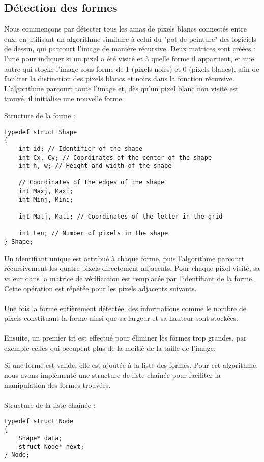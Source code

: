 \documentclass{article}
\begin{document}
\newpage
\subsection{Détection des formes}

Nous commençons par détecter tous les amas de pixels blancs connectés entre eux, en utilisant un algorithme similaire à celui du "pot de peinture" des logiciels de dessin, qui parcourt l'image de manière récursive.
Deux matrices sont créées : l'une pour indiquer si un pixel a été visité et à quelle forme il appartient, et une autre qui stocke l'image sous forme de 1 (pixels noirs) et 0 (pixels blancs), afin de faciliter la distinction des pixels blancs et noirs dans la fonction récursive.
L'algorithme parcourt toute l'image et, dès qu'un pixel blanc non visité est trouvé, il initialise une nouvelle forme.

\noindent Structure de la forme :
\begin{lstlisting}
typedef struct Shape 
{
    int id; // Identifier of the shape
    int Cx, Cy; // Coordinates of the center of the shape
    int h, w; // Height and width of the shape

    // Coordinates of the edges of the shape
    int Maxj, Maxi;
    int Minj, Mini;

    int Matj, Mati; // Coordinates of the letter in the grid

    int Len; // Number of pixels in the shape
} Shape;

\end{lstlisting}

\vspace{0.5cm}
\newpage
Un identifiant unique est attribué à chaque forme, puis l'algorithme parcourt récursivement les quatre pixels directement adjacents. Pour chaque pixel visité, sa valeur dans la matrice de vérification est remplacée par l’identifiant de la forme. Cette opération est répétée pour les pixels adjacents suivants.
\\\\
Une fois la forme entièrement détectée, des informations comme le nombre de pixels constituant la forme ainsi que sa largeur et sa hauteur sont stockées.
\\\\
Ensuite, un premier tri est effectué pour éliminer les formes trop grandes, par exemple celles qui occupent plus de la moitié de la taille de l'image.

Si une forme est valide, elle est ajoutée à la liste des formes. Pour cet algorithme, nous avons implémenté une structure de liste chaînée pour faciliter la manipulation des formes trouvées.
\\\\
Structure de la liste chaînée :
\begin{lstlisting}
typedef struct Node
{
    Shape* data;
    struct Node* next;
} Node;
\end{lstlisting}
\end{document}
